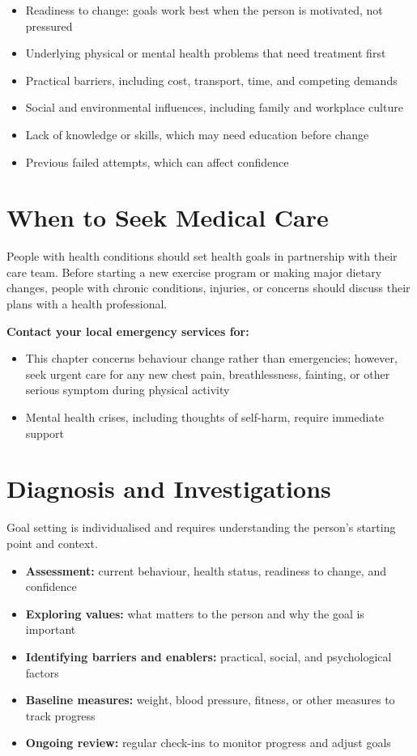\begin{itemize}
    \item Readiness to change: goals work best when the person is motivated, not pressured
    \item Underlying physical or mental health problems that need treatment first
    \item Practical barriers, including cost, transport, time, and competing demands
    \item Social and environmental influences, including family and workplace culture
    \item Lack of knowledge or skills, which may need education before change
    \item Previous failed attempts, which can affect confidence
\end{itemize}

\section*{When to Seek Medical Care}
People with health conditions should set health goals in partnership with their care team. Before starting a new exercise program or making major dietary changes, people with chronic conditions, injuries, or concerns should discuss their plans with a health professional.

\textbf{Contact your local emergency services for:}
\begin{itemize}
    \item This chapter concerns behaviour change rather than emergencies; however, seek urgent care for any new chest pain, breathlessness, fainting, or other serious symptom during physical activity
    \item Mental health crises, including thoughts of self-harm, require immediate support
\end{itemize}

\section*{Diagnosis and Investigations}
Goal setting is individualised and requires understanding the person's starting point and context.

\begin{itemize}
    \item \textbf{Assessment:} current behaviour, health status, readiness to change, and confidence
    \item \textbf{Exploring values:} what matters to the person and why the goal is important
    \item \textbf{Identifying barriers and enablers:} practical, social, and psychological factors
    \item \textbf{Baseline measures:} weight, blood pressure, fitness, or other measures to track progress
    \item \textbf{Ongoing review:} regular check-ins to monitor progress and adjust goals
\end{itemize}

